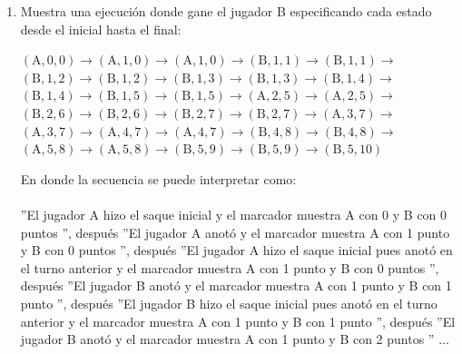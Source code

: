 \begin{exercise}
\begin{enumerate}
\[{\begin{array}{lcl}
                    \end{array}
                }
                \]
                \bigskip
                \[
                \scalemath{0.81}{
                    \begin{array}{lcl}    
                        \inference{(\text{A},\text{X},\text{Y}) \text{ Estado},& (\text{B},\text{X},\text{Y}) \text{ Estado}}{(\text{A},\text{X},\text{Y})\rightarrow(\text{B},\text{X},\text{Y})  \text{ Estado}}[$(\text{A}-)$] \qquad 
                        \inference{(\text{B},\text{X},\text{Y}) \text{ Estado},& (\text{A},\text{X},\text{Y}) \text{ Estado}}{(\text{B},\text{X},\text{Y})\rightarrow(\text{A},\text{X},\text{Y})  \text{ Estado}}[$(\text{B}-)$] 
                    \end{array}
                }
                \]
            \item Muestra una ejecución donde gane el jugador B especificando cada estado desde el inicial hasta el final: 
                \begin{center}
                    $ (\text{A},0,0) \rightarrow (\text{A},1,0) \rightarrow (\text{A},1,0) \rightarrow (\text{B},1,1) \rightarrow (\text{B},1,1) \rightarrow$ \\
                    $ (\text{B},1,2) \rightarrow (\text{B},1,2) \rightarrow (\text{B},1,3) \rightarrow (\text{B},1,3) \rightarrow (\text{B},1,4) \rightarrow$ \\
                    $ (\text{B},1,4) \rightarrow (\text{B},1,5) \rightarrow (\text{B},1,5) \rightarrow (\text{A},2,5) \rightarrow (\text{A},2,5) \rightarrow$ \\
                    $ (\text{B},2,6) \rightarrow (\text{B},2,6) \rightarrow (\text{B},2,7) \rightarrow (\text{B},2,7) \rightarrow (\text{A},3,7) \rightarrow$ \\
                    $ (\text{A},3,7) \rightarrow (\text{A},4,7) \rightarrow (\text{A},4,7) \rightarrow (\text{B},4,8) \rightarrow (\text{B},4,8) \rightarrow $\\
                    $ (\text{A},5,8) \rightarrow (\text{A},5,8) \rightarrow (\text{B},5,9) \rightarrow (\text{B},5,9) \rightarrow (\text{B},5,10) $
                \end{center}
                En donde la secuencia se puede interpretar como: \\\\
                 ''El jugador A hizo el saque inicial y el marcador muestra A con 0 y B con 0 puntos '', después  ''El jugador A anotó y el marcador muestra A con 1 punto y B con 0 puntos '', después  ''El jugador A hizo el saque inicial pues anotó en el turno anterior y el marcador muestra A con 1 punto y B con 0 puntos '', después  ''El jugador B anotó y el marcador muestra A con 1  punto y B con 1 punto '', después  ''El jugador B hizo el saque inicial pues anotó en el turno anterior y el marcador muestra A con 1  punto y B con 1 punto '', después  ''El jugador B anotó y el marcador muestra A con 1  punto y B con 2 puntos '' ...            
        \end{enumerate}

    \end{exercise}


